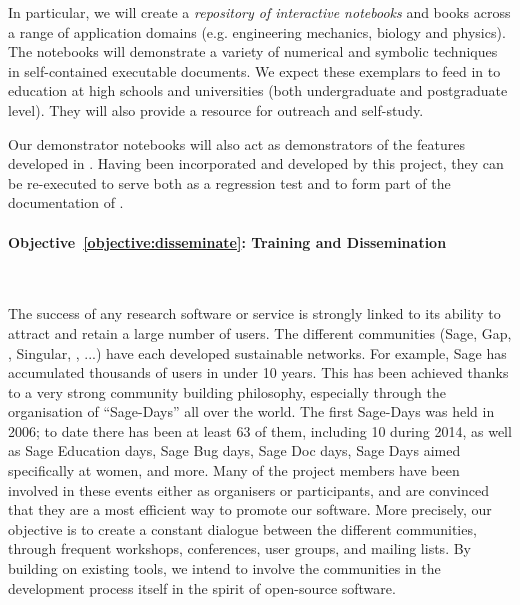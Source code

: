 \documentclass[noworkareas,deliverables,\classoptions]{euproposal}       %
\begin{document}
\begin{proposal}
In particular, we will create a \emph{repository of interactive
  notebooks}  and books across a range
of application domains (e.g. engineering mechanics, biology and
physics). The notebooks will demonstrate a variety of numerical and
symbolic techniques in self-contained executable documents. We expect
these exemplars to feed in to education at high schools and
universities (both undergraduate and postgraduate level). They will
also provide a resource for outreach and self-study.

Our demonstrator notebooks will also act as demonstrators of the
features developed in \TheProject. Having been incorporated and
developed by this project, they can be re-executed to serve both as a
regression test and to form part of the documentation of \TheProject.



\paragraph{Objective~\ref{objective:disseminate}: Training and Dissemination}\

The success of any research software or service is strongly linked to
its ability to attract and retain a large number of users. The
different communities (Sage, Gap, \PariGP, Singular, \Jupyter, ...)
have each developed sustainable networks. For example, Sage has
accumulated thousands of users in under 10 years. This has been
achieved thanks to a very strong community building philosophy,
especially through the organisation of ``Sage-Days'' all over the
world. The first Sage-Days was held in 2006; to date there has been
at least 63 of them, including 10 during 2014, as well as Sage
Education days, Sage Bug days, Sage Doc days, Sage Days aimed
specifically at women, and more. Many of the \TheProject{} project
members have been involved in these events either as organisers or
participants, and are convinced that they are a most efficient way to
promote our software. More precisely, our objective is to create a
constant dialogue between the different communities, through frequent
workshops, conferences, user groups, and mailing lists. By building on
existing tools, we intend to involve the communities in the
development process itself in the spirit of open-source software.


\end{proposal}
\end{document}
